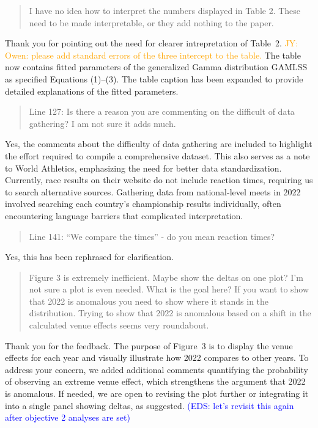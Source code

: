 \documentclass[12pt]{article}
\newcommand{\jy}[1]{\textcolor{orange}{JY: #1}}
\newcommand{\eds}[1]{\textcolor{blue}{(EDS: #1)}}
\newenvironment{comment}%
{\begin{quotation}\noindent\small\it\color{darkblue}\ignorespaces%
}{\end{quotation}}
\begin{document}
\begin{comment}
I have no idea how to interpret the numbers displayed in Table 2. These
need to be made interpretable, or they add nothing to the paper.
\end{comment}

Thank you for pointing out the need for clearer intrepretation of
Table~2.
\jy{Owen: please add standard errors of the three intercept  to the table.}
The table now contains fitted parameters of the generalized Gamma
distribution GAMLSS as specified Equations (1)--(3). The table caption has been
expanded to provide detailed explanations of the fitted parameters.


\begin{comment}
Line 127: Is there a reason you are commenting on the difficult of data
gathering? I am not sure it adds much.
\end{comment}


Yes, the comments about the difficulty of data gathering are included
to highlight the effort required to compile a comprehensive
dataset. This also serves as a note to World Athletics, emphasizing
the need for better data standardization. Currently, race results on
their website do not include reaction times, requiring us to search
alternative sources. Gathering data from national-level meets in 2022
involved searching each country’s championship results individually,
often encountering language barriers that complicated interpretation.


\begin{comment}
Line 141: “We compare the times” - do you mean reaction times?
\end{comment}

Yes, this has been rephrased for clarification.

\begin{comment}
Figure 3 is extremely inefficient. Maybe show the deltas on one plot? I'm not
sure a plot is even needed. What is the goal here? If you want to show that 2022
is anomalous you need to show where it stands in the distribution. Trying to
show that 2022 is anomalous based on a shift in the calculated venue effects
seems very roundabout.
\end{comment}


Thank you for the feedback. The purpose of Figure~3 is to display the venue 
effects for each year and visually illustrate how 2022 compares to other years. 
To address your concern, we added additional comments quantifying the 
probability of observing an extreme venue effect, which strengthens the 
argument that 2022 is anomalous. If needed, we are open to revising the plot 
further or integrating it into a single panel showing deltas, as suggested.
\eds{let's revisit this again after objective 2 analyses are set}




\end{document}
